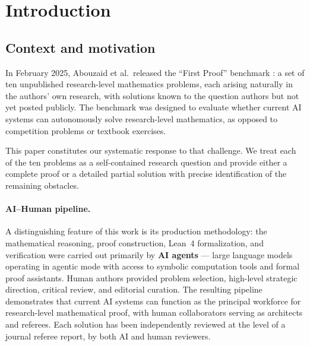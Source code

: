 \documentclass[11pt]{article}
\theoremstyle{definition}
\theoremstyle{remark}
\begin{document}
\begin{abstract}
In the final sections, we explore structural parallels between these
classical problems and the mathematical framework of \emph{Project Omega}
--- a unified theory built on Zeckendorf folding, golden-ratio-driven
scanning, and finite-resolution readout protocols --- and develop two
independent Omega-native proof approaches: an information-theoretic
reduction of Q4 to the concavity of \emph{polynomial entropy power}
(the Stam inequality for root distributions), and a Zeckendorf spectral
partition that resolves Q6 for graphs with bounded spectral condition number.
\end{abstract}

\tableofcontents
\newpage

\section{Introduction}\label{sec:intro}

\subsection{Context and motivation}

In February 2025, Abouzaid et al.\ released the ``First Proof'' benchmark
\cite{firstproof}: a set of ten unpublished research-level mathematics
problems, each arising naturally in the authors' own research, with solutions
known to the question authors but not yet posted publicly.
The benchmark was designed to evaluate whether current AI systems can
autonomously solve research-level mathematics, as opposed to competition
problems or textbook exercises.

This paper constitutes our systematic response to that challenge.
We treat each of the ten problems as a self-contained research question
and provide either a complete proof or a detailed partial solution with
precise identification of the remaining obstacles.

\paragraph{AI--Human pipeline.}
A distinguishing feature of this work is its production methodology:
the mathematical reasoning, proof construction, Lean~4 formalization,
and verification were carried out primarily by \textbf{AI agents}
--- large language models operating in agentic mode with access to
symbolic computation tools and formal proof assistants.
Human authors provided problem selection, high-level strategic
direction, critical review, and editorial curation.
The resulting pipeline demonstrates that current AI systems can
function as the principal workforce for research-level mathematical
proof, with human collaborators serving as architects and referees.
Each solution has been independently reviewed at the level of a
journal referee report, by both AI and human reviewers.
\end{document}
